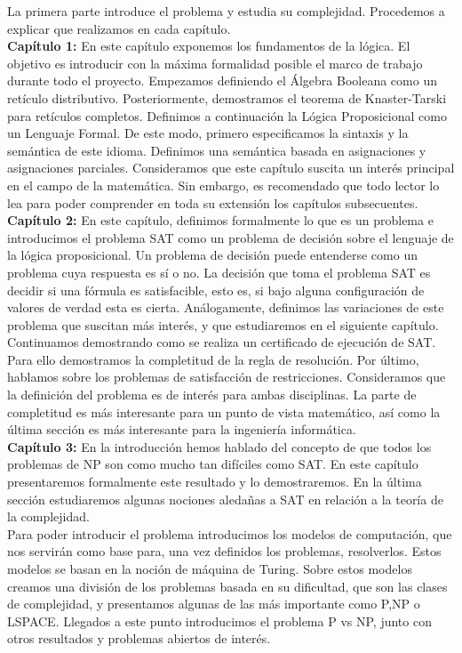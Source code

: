 La primera parte introduce el problema y estudia su complejidad. Procedemos a explicar que realizamos en cada capítulo.\\

\textbf{Capítulo 1:} En este capítulo exponemos los fundamentos de la lógica. El objetivo es introducir con la máxima formalidad posible el marco de trabajo durante todo el proyecto. 
Empezamos definiendo el Álgebra Booleana como un retículo distributivo. Posteriormente, demostramos el teorema de Knaster-Tarski para retículos completos. Definimos a continuación la Lógica Proposicional como un Lenguaje Formal. De este modo, primero especificamos la sintaxis y la semántica de este idioma. Definimos una semántica basada en asignaciones y asignaciones parciales. Consideramos que este capítulo suscita un interés principal en el campo de la matemática. Sin embargo, es recomendado que todo lector lo lea para poder comprender en toda su extensión los capítulos subsecuentes.\\

\textbf{Capítulo 2:} En este capítulo, definimos formalmente lo que es un problema e introducimos el problema SAT como un problema de decisión sobre el lenguaje de la lógica proposicional. Un  problema de decisión puede entenderse como un problema cuya respuesta es sí o no. La decisión que toma el problema SAT es decidir si una fórmula es satisfacible, esto es, si bajo alguna configuración de valores de verdad esta es cierta. Análogamente, definimos las variaciones de este problema que suscitan más interés, y que estudiaremos en el siguiente capítulo. Continuamos demostrando como se realiza un certificado de ejecución de SAT. Para ello demostramos la completitud de la regla de resolución. Por último, hablamos sobre los problemas de satisfacción de restricciones. Consideramos que la definición del problema es de interés para ambas disciplinas. La parte de completitud es más interesante para un punto de vista matemático, así como la última sección es más interesante para la ingeniería informática.\\

\textbf{Capítulo 3:} En la introducción hemos hablado del concepto de que todos los problemas de NP son como mucho tan difíciles como SAT. En este capítulo presentaremos formalmente este resultado y lo demostraremos. En la última sección estudiaremos algunas nociones aledañas a SAT en relación a la teoría de la complejidad.\\

Para poder introducir el problema introducimos los modelos de computación, que nos servirán como base para, una vez definidos los problemas, resolverlos. Estos modelos se basan en la noción de máquina de Turing. Sobre estos modelos creamos una división de los problemas basada en su dificultad, que son las clases de complejidad, y presentamos algunas de las más importante como P,NP o LSPACE. Llegados a este punto introducimos el problema P vs NP, junto con otros resultados y problemas abiertos de interés.\\


